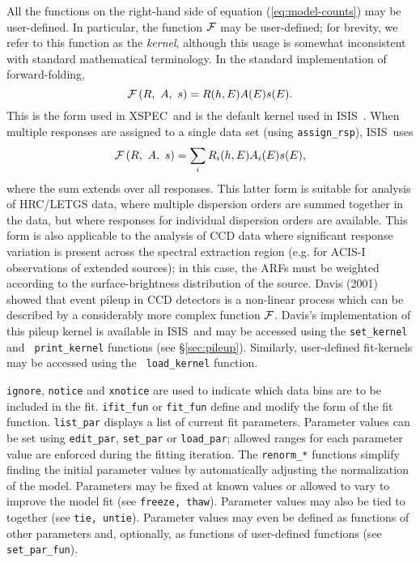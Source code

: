 \documentclass{book}
\newcommand{\isisx}{{\sc ISIS~}}
\newcommand{\xspec}{{\sc XSPEC}}
\begin{document}
{All the functions on the right-hand side of equation
(\ref{eq:model-counts}) may be user-defined.  In particular, the
function ${\cal F}$ may be user-defined; for brevity, we refer to
this function as the {\it kernel}, although this usage is somewhat
inconsistent with standard mathematical terminology. In the
standard implementation of forward-folding,
\begin{equation}
   {\cal F}\left(R,\ A,\ s\right) = R(h,E)A(E)s(E).
\end{equation}
This is the form used in \xspec\  and is the default kernel used in
\isisx.  When multiple responses are assigned to a single data set (using
{\tt assign\_rsp}), \isisx uses
\begin{equation}
   {\cal F}\left(R,\ A,\ s\right) = \sum_i R_i(h,E)A_i(E)s(E),
\end{equation}
where the sum extends over all responses.  This latter form is
suitable for analysis of HRC/LETGS data, where multiple dispersion
orders are summed together in the data, but where responses for
individual dispersion orders are available.  This form is also
applicable to the analysis of CCD data where significant response
variation is present across the spectral extraction region (e.g.
for ACIS-I observations of extended sources); in this case, the
ARFs must be weighted according to the surface-brightness
distribution of the source. Davis (2001) showed that event pileup
in CCD detectors is a non-linear process which can be described by
a considerably more complex function ${\cal F}$. Davis's
implementation of this pileup kernel is available in \isisx and
may be accessed using the {\tt set\_kernel} and {\tt
print\_kernel} functions (see \S\ref{sec:pileup}).  Similarly,
user-defined fit-kernels may be accessed using the {\tt
load\_kernel} function.

{\tt ignore}, {\tt notice} and {\tt xnotice} are used to indicate
which data bins are to be included in the fit. {\tt ifit\_fun} or
{\tt fit\_fun} define and modify the form of the fit function.
{\tt list\_par} displays a list of current fit parameters.
Parameter values can be set using {\tt edit\_par}, {\tt set\_par}
or {\tt load\_par}; allowed ranges for each parameter value are
enforced during the fitting iteration. The {\tt renorm\_*}
functions simplify finding the initial parameter values by
automatically adjusting the normalization of the model. Parameters
may be fixed at known values or allowed to vary to improve the
model fit (see {\tt freeze, thaw}). Parameter values may also be
tied to together (see {\tt tie, untie}). Parameter values may even
be defined as functions of other parameters and, optionally, as
functions of user-defined functions (see \verb|set_par_fun|).

}
\end{document}
